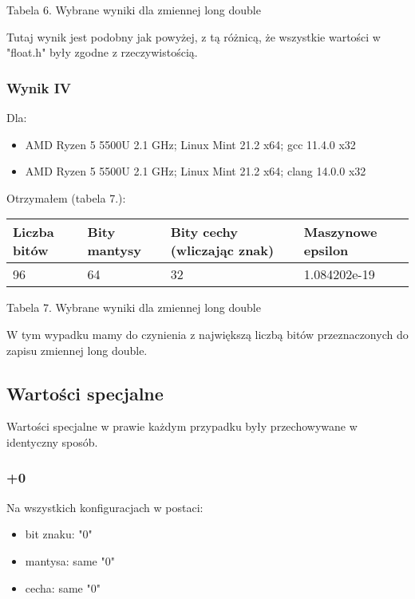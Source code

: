 \documentclass{article}
\begin{document}
\centerline{Tabela 6. Wybrane wyniki dla zmiennej long double}
\bigbreak

Tutaj wynik jest podobny jak powyżej, z tą różnicą, że wszystkie wartości w "float.h" były zgodne z rzeczywistością. 

\subsubsection{Wynik IV}

Dla:
\begin{itemize}
\item AMD Ryzen 5 5500U 2.1 GHz; Linux Mint 21.2 x64; gcc 11.4.0 x32
\item AMD Ryzen 5 5500U 2.1 GHz; Linux Mint 21.2 x64; clang 14.0.0 x32
\end{itemize}

Otrzymałem (tabela 7.):

\begin{table}[!ht]
    \centering
    \begin{tabular}{|l|l|l|l|}
    \hline
        Liczba bitów & Bity mantysy & Bity cechy (wliczając znak) & Maszynowe epsilon  \\ \hline
        96 & 64 & 32 & 1.084202e-19 \\ \hline
    \end{tabular}
\end{table}

\centerline{Tabela 7. Wybrane wyniki dla zmiennej long double}
\bigbreak

W tym wypadku mamy do czynienia z największą liczbą bitów przeznaczonych do zapisu zmiennej long double.

\subsection{Wartości specjalne}

Wartości specjalne w prawie każdym przypadku były przechowywane w identyczny sposób.

\subsubsection{+0}

Na wszystkich konfiguracjach w postaci:
\begin{itemize}
\item bit znaku: "0"
\item mantysa: same "0"
\item cecha: same "0"
\end{itemize}
\end{document}
